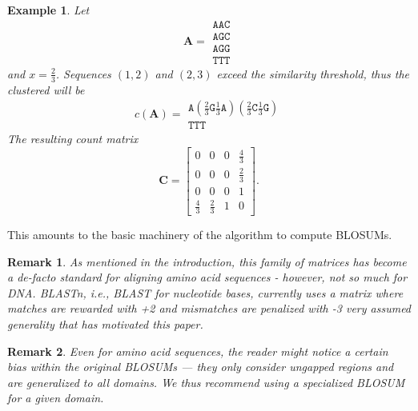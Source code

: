 \documentclass{article}
\newtheorem{example}{Example}
\newtheorem{remark}{Remark}
\begin{document}
\begin{example}
	Let
	\begin{equation*}
		\mathbf A = \begin{matrix}
			\mathtt{AAC} \\
			\mathtt{AGC} \\
			\mathtt{AGG} \\
			\mathtt{TTT}
		\end{matrix}	
	\end{equation*}
	and $x = \frac 2 3$. Sequences $(1, 2)$ and $(2, 3)$ exceed the similarity threshold,
	thus the clustered  will be
	\begin{equation*}
		c(\mathbf A) = \begin{matrix}
		\mathtt{A}(\frac 2 3 \mathtt G \frac 1 3 \mathtt A)(\frac 2 3 \mathtt C \frac 1 3 \mathtt G) \\	
		\mathtt{TTT}
		\end{matrix} 	
	\end{equation*}
	The resulting count matrix 
	\begin{equation*}
			\mathbf C = \begin{bmatrix}
			0 & 0 & 0 & \frac 4 3 \\
			0 & 0 & 0 & \frac 2 3 \\
			0 & 0 & 0 & 1 \\
			\frac 4 3 & \frac 2 3 & 1 & 0
		\end{bmatrix}.
	\end{equation*}
\end{example}
This amounts to the basic machinery of the algorithm to compute BLOSUMs.

\begin{remark}
	As mentioned in the introduction, this family of matrices has become a de-facto standard for aligning amino acid
sequences - however, not so much for DNA. BLASTn, i.e., BLAST for nucleotide bases, currently uses a matrix where
matches are rewarded with +2 and mismatches are penalized with -3 \cite{altschulBasicLocalAlignment1990}
very assumed generality that has motivated this paper.
\end{remark}

\begin{remark} \label{aminoAcidSequencesShouldHaveSpecialBLOSUM}
	Even for amino acid sequences, the reader might notice a certain bias 
	within the original BLOSUMs --- they only consider ungapped regions
	and are generalized to all domains. We thus recommend using a specialized
	BLOSUM for a given domain.
\end{remark}
\end{document}
